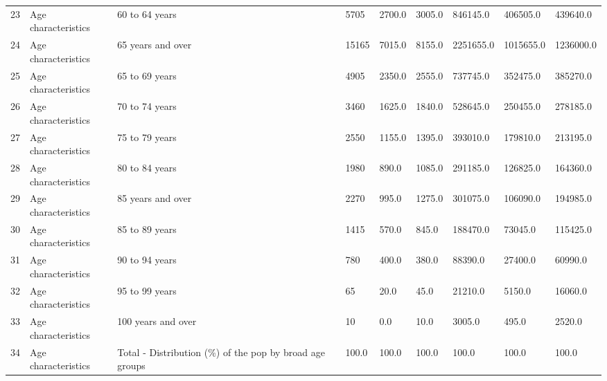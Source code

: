 \documentclass[10pt,a4paper]{report}
\begin{document}
\begin{table}[H]
\begin{adjustbox}{width=1\textwidth}
\begin{tabular}{@{}lllllllll@{}}
				23 & Age characteristics      & 60 to 64 years                                                               & 5705   & 2700.0  & 3005.0  & 846145.0   & 406505.0  & 439640.0   \\
				24 & Age characteristics      & 65 years and over                                                            & 15165  & 7015.0  & 8155.0  & 2251655.0  & 1015655.0 & 1236000.0  \\
				25 & Age characteristics      & 65 to 69 years                                                               & 4905   & 2350.0  & 2555.0  & 737745.0   & 352475.0  & 385270.0   \\
				26 & Age characteristics      & 70 to 74 years                                                               & 3460   & 1625.0  & 1840.0  & 528645.0   & 250455.0  & 278185.0   \\
				27 & Age characteristics      & 75 to 79 years                                                               & 2550   & 1155.0  & 1395.0  & 393010.0   & 179810.0  & 213195.0   \\
				28 & Age characteristics      & 80 to 84 years                                                               & 1980   & 890.0   & 1085.0  & 291185.0   & 126825.0  & 164360.0   \\
				29 & Age characteristics      & 85 years and over                                                            & 2270   & 995.0   & 1275.0  & 301075.0   & 106090.0  & 194985.0   \\
				30 & Age characteristics      & 85 to 89 years                                                               & 1415   & 570.0   & 845.0   & 188470.0   & 73045.0   & 115425.0   \\
				31 & Age characteristics      & 90 to 94 years                                                               & 780    & 400.0   & 380.0   & 88390.0    & 27400.0   & 60990.0    \\
				32 & Age characteristics      & 95 to 99 years                                                               & 65     & 20.0    & 45.0    & 21210.0    & 5150.0    & 16060.0    \\
				33 & Age characteristics      & 100 years and over                                                           & 10     & 0.0     & 10.0    & 3005.0     & 495.0     & 2520.0     \\
				34 & Age characteristics      & Total - Distribution (\%) of the pop by broad age groups & 100.0  & 100.0   & 100.0   & 100.0      & 100.0     & 100.0      \\

\end{tabular}
\end{adjustbox}
\end{table}
\end{document}
